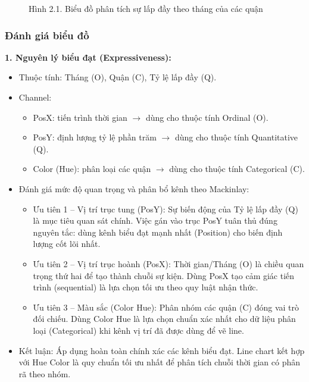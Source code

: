 \begin{figure}[H]
    \centering
    \caption{Hình 2.1. Biểu đồ phân tích sự lấp đầy theo tháng của các quận}
    \label{fig:domain-task2-chart1}
\end{figure}

\subsubsection{Đánh giá biểu đồ}

\textbf{1. Nguyên lý biểu đạt (Expressiveness):}

\begin{itemize}
    \item Thuộc tính: Tháng (O), Quận (C), Tỷ lệ lấp đầy (Q).
    \item Channel:
    \begin{itemize}
        \item PosX: tiến trình thời gian $\rightarrow$ dùng cho thuộc tính Ordinal (O).
        \item PosY: định lượng tỷ lệ phần trăm $\rightarrow$ dùng cho thuộc tính Quantitative (Q).
        \item Color (Hue): phân loại các quận $\rightarrow$ dùng cho thuộc tính Categorical (C).
    \end{itemize}
    \item Đánh giá mức độ quan trọng và phân bổ kênh theo Mackinlay:
    \begin{itemize}
        \item Ưu tiên 1 -- Vị trí trục tung (PosY): Sự biến động của Tỷ lệ lấp đầy (Q) là mục tiêu quan sát chính. Việc gán vào trục PosY tuân thủ đúng nguyên tắc: dùng kênh biểu đạt mạnh nhất (Position) cho biến định lượng cốt lõi nhất.
        \item Ưu tiên 2 -- Vị trí trục hoành (PosX): Thời gian/Tháng (O) là chiều quan trọng thứ hai để tạo thành chuỗi sự kiện. Dùng PosX tạo cảm giác tiến trình (sequential) là lựa chọn tối ưu theo quy luật nhận thức.
        \item Ưu tiên 3 -- Màu sắc (Color Hue): Phân nhóm các quận (C) đóng vai trò đối chiếu. Dùng Color Hue là lựa chọn chuẩn xác nhất cho dữ liệu phân loại (Categorical) khi kênh vị trí đã được dùng để vẽ line.
    \end{itemize}
    \item Kết luận: Áp dụng hoàn toàn chính xác các kênh biểu đạt. Line chart kết hợp với Hue Color là quy chuẩn tối ưu nhất để phân tích chuỗi thời gian có phân rã theo nhóm.
\end{itemize}

